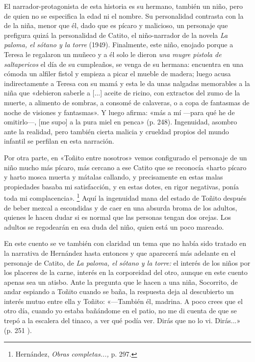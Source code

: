 \documentclass[14pt,twoside,final]{extbook} %
\let\oldfootnote\footnote
\renewcommand\footnote[1]{%
\oldfootnote{\hspace{1mm}#1}}
\begin{document}
El narrador-protagonista de esta historia es su hermano, también un niño, pero de quien no se especifica la edad ni el nombre. Su personalidad contrasta con la de la niña, menor que él, dado que es pícaro y malicioso, un personaje que prefigura quizá la personalidad de Catito, el niño-narrador de la novela \emph{La paloma, el sótano y la torre} (1949). Finalmente, este niño, enojado porque a Teresa le regalaron un muñeco y a él solo le dieron \emph{una mugre pistola de saltapericos} el día de su cumpleaños, se venga de su hermana: encuentra en una cómoda un alfiler fistol y empieza a picar el mueble de madera; luego acusa indirectamente a Teresa con su mamá y esta le da unas nalgadas memorables a la niña que «debieron saberle a [...] aceite de ricino, con extractos del zumo de la muerte, a alimento de sombras, a consomé de calaveras, o a copa de fantasmas de noche de visiones y fantasmas». Y luego afirma: «más a mí ---para qué he de omitirlo---, [me supo] a la pura miel en penca» (p. 248). Ingenuidad, asombro ante la realidad, pero también cierta malicia y crueldad propios del mundo infantil se perfilan en esta narración.

Por otra parte, en «Toñito entre nosotros» vemos configurado el personaje de un niño mucho más pícaro, más cercano a ese Catito que se reconocía «harto pícaro y harto mosca muerta y mátalas callando, y precisamente en estas malas propiedades basaba mi satisfacción, y en estas dotes, en rigor negativas, ponía toda mi complacencia».\footnote{Hernández, \emph{Obras completas...,} p. 297.} Aquí la ingenuidad mana del estado de Toñito después de beber mezcal a escondidas y de caer en una absurda broma de los adultos, quienes le hacen dudar si es normal que las personas tengan dos orejas. Los adultos se regodearán en esa duda del niño, quien está un poco mareado.

En este cuento se ve también con claridad un tema que no había sido tratado en la narrativa de Hernández hasta entonces y que aparecerá más adelante en el personaje de Catito, de \emph{La paloma, el sótano y la torre:} el interés de los niños por los placeres de la carne, interés en la corporeidad del otro, aunque en este cuento apenas sea un atisbo. Ante la pregunta que le hacen a una niña, Socorrito, de andar espiando a Toñito cuando se baña, la respuesta deja al descubierto un interés mutuo entre ella y Toñito: «---También él, madrina. A poco crees que el otro día, cuando yo estaba bañándome en el patio, no me di cuenta de que se trepó a la escalera del tinaco, a ver qué podía ver. Dirás que no lo vi. Dirás...» (p. 251 ).
\end{document}
